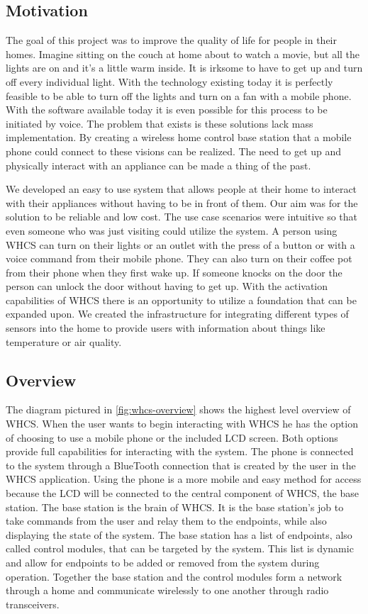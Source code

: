 \subsection{Motivation}
The goal of this project was to improve the quality of life for people in their
homes. Imagine sitting on the couch at home about to watch a movie, but all the
lights are on and it{}'s a little warm inside. It is irksome to have to get up
and turn off every individual light. With the technology existing today it is
perfectly feasible to be able to turn off the lights and turn on a fan with a
mobile phone. With the software available today it is even possible for this
process to be initiated by voice. The problem that exists is these solutions
lack mass implementation. By creating a wireless home control base station that
a mobile phone could connect to these visions can be realized. The need to get
up and physically interact with an appliance can be made a thing of the past.

We developed an easy to use system that allows people at their home to
interact with their appliances without having to be in front of them. Our aim
was for the solution to be reliable and low cost. The use case scenarios were  intuitive so that even someone who was just visiting could utilize the
system. A person using WHCS can turn on their lights or an outlet
with the press of a button or with a voice command from their mobile phone.
They can also turn on their coffee pot from their phone when they
first wake up. If someone knocks on the door the person can
unlock the door without having to get up. With the activation capabilities of
WHCS there is an opportunity to utilize a foundation that can be expanded upon.
We created the infrastructure for integrating different types of sensors into
the home to provide users with information about things like temperature or air
quality.

\subsection{Overview}
The diagram pictured in \autoref{fig:whcs-overview} shows the highest level
overview of WHCS.  When the user wants to begin interacting with WHCS he has
the option of choosing to use a mobile phone or the included LCD screen. Both
options provide full capabilities for interacting with the system. The
phone is connected to the system through a BlueTooth connection that is
created by the user in the WHCS application. Using the phone is a more
mobile and easy method for access because the LCD will be connected to the
central component of WHCS, the base station. The base station is the
brain of WHCS. It is the base station{}'s job to take commands from the
user and relay them to the endpoints, while also displaying the state of the
system. The base station has a list of endpoints, also called control
modules, that can be targeted by the system. This list is dynamic and
allow for endpoints to be added or removed from the system during operation.
Together the base station and the control modules form a network through a
home and communicate wirelessly to one another through radio transceivers.

